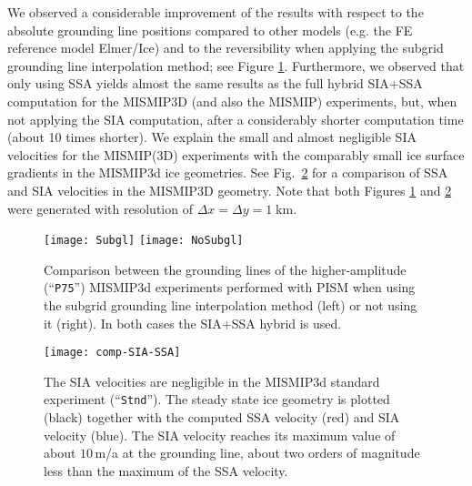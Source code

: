 We observed a considerable improvement of the results with respect to the absolute grounding line positions compared to other models (e.g. the FE reference model Elmer/Ice) and to the reversibility when applying the subgrid grounding line interpolation method; see Figure \ref{fig:Subgl}.  Furthermore, we observed that only using SSA yields almost the same results as the full hybrid SIA+SSA computation for the MISMIP3D (and also the MISMIP) experiments, but, when not applying the SIA computation, after a considerably shorter computation time (about 10 times shorter).  We explain the small and almost negligible SIA velocities for the MISMIP(3D) experiments with the comparably small ice surface gradients in the MISMIP3d ice geometries.  See Fig.~\ref{fig:compSIASSA} for a comparison of SSA and SIA velocities in the MISMIP3D geometry.  Note that both Figures \ref{fig:Subgl} and \ref{fig:compSIASSA} were generated with resolution of $\Delta x = \Delta y = 1\;$km.

\begin{figure}[ht]
\centering
\texttt{[image: Subgl]}
\texttt{[image: NoSubgl]}
\caption{Comparison between the grounding lines of the higher-amplitude (``\texttt{P75}'') MISMIP3d experiments performed with PISM when using the subgrid grounding line interpolation method (left) or not using it (right).  In both cases the SIA+SSA hybrid is used.}
\label{fig:Subgl}
\end{figure}

\begin{figure}[ht]
\centering
\texttt{[image: comp-SIA-SSA]}
\caption{The SIA velocities are negligible in the MISMIP3d standard experiment (``\texttt{Stnd}'').  The steady state ice geometry is plotted (black) together with the computed SSA velocity (red) and SIA velocity (blue). The SIA velocity reaches its maximum value of about $10\,$m/a at the grounding line, about two orders of magnitude less than the maximum of the SSA velocity.}
\label{fig:compSIASSA}
\end{figure}

